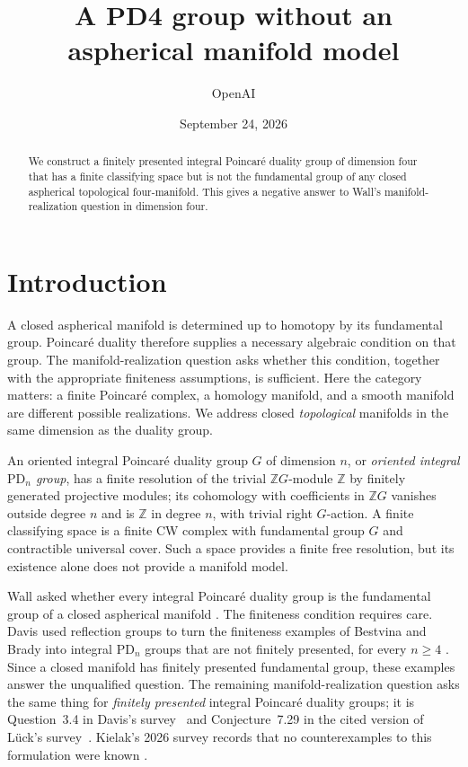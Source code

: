 \documentclass[11pt]{article}
\title{A PD4 group without an aspherical manifold model}
\author{OpenAI}
\date{September 24, 2026}
\theoremstyle{definition}
\theoremstyle{remark}
\newcommand{\Z}{\mathbb Z}
\newcommand{\PD}{\mathrm{PD}}
\begin{document}
\maketitle
\begin{abstract}
We construct a finitely presented integral Poincar\'e duality group of
dimension four that has a finite classifying space but is not the fundamental
group of any closed aspherical topological four-manifold. This gives a negative
answer to Wall's manifold-realization question in dimension four.
\end{abstract}

\section{Introduction}\label{sec:introduction}

A closed aspherical manifold is determined up to homotopy by its
fundamental group. Poincar\'e duality therefore supplies a necessary
algebraic condition on that group. The manifold-realization question asks
whether this condition, together with the appropriate finiteness
assumptions, is sufficient. Here the category matters: a finite Poincar\'e
complex, a homology manifold, and a smooth manifold are different possible
realizations. We address closed \emph{topological} manifolds in the same
dimension as the duality group.

An oriented integral Poincar\'e duality group $G$ of dimension $n$, or
\emph{oriented integral $\PD_n$ group}, has a finite resolution of the
trivial $\Z G$-module $\Z$ by finitely generated projective modules;
its cohomology with coefficients in $\Z G$ vanishes outside degree $n$
and is $\Z$ in degree $n$, with trivial right $G$-action. A finite
classifying space is a finite CW complex with fundamental group $G$
and contractible universal cover. Such a space provides a finite free
resolution, but its existence alone does not provide a manifold model.

Wall asked whether every integral Poincar\'e duality group is the
fundamental group of a closed aspherical manifold
\cite[Problem~G2]{WallProblems}. The finiteness condition requires care.
Davis used reflection groups to turn the finiteness examples of
Bestvina and Brady into integral $\PD_n$ groups that are not finitely
presented, for every $n\geq4$ \cite[Theorem~C]{DavisCohomology}.
Since a closed manifold has finitely presented fundamental group,
these examples answer the unqualified question. The remaining
manifold-realization question asks the same thing for \emph{finitely
presented} integral Poincar\'e duality groups; it is Question~3.4 in
Davis's survey~\cite{DavisPD} and Conjecture~7.29 in the cited version
of L\"uck's survey~\cite{LuckFJ}. Kielak's 2026 survey records that
no counterexamples to this formulation were known
\cite[Section~4.1]{Kielak}.
\end{document}
